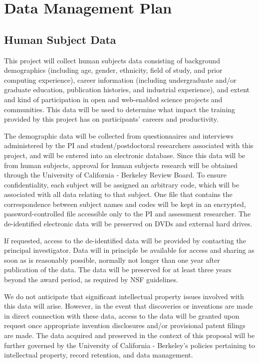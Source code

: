 \documentclass{proposalnsf}
\newlength{\up}
\begin{document}
\newpage
{}
\renewcommand{\thepage} {\footnotesize Data Management\,---\,\arabic{page}}

\section*{Data Management Plan}

\subsection*{Human Subject Data}

This project will collect human subjects data consisting of background
demographics (including age, gender, ethnicity, field of study, and
prior computing experience), career information (including
undergraduate and/or graduate education, publication histories, and
industrial experience), and extent and kind of participation in open
and web-enabled science projects and communities.  This data will be
used to determine what impact the training provided by this project
has on participants' careers and productivity.

The demographic data will be collected from questionnaires and
interviews administered by the PI and student/postdoctoral researchers
associated with this project, and will be entered into an electronic
database.  Since this data will be from human subjects, approval for
human subjects research will be obtained through the University of
California - Berkeley Review Board.  To ensure confidentiality, each
subject will be assigned an arbitrary code, which will be associated
with all data relating to that subject.  One file that contains the
correspondence between subject names and codes will be kept in an
encrypted, password-controlled file accessible only to the PI and
assessment researcher.  The de-identified electronic data will be
preserved on DVDs and external hard drives.

If requested, access to the de-identified data will be provided by
contacting the principal investigator. Data will in principle be
available for access and sharing as soon as is reasonably possible,
normally not longer than one year after publication of the data. The
data will be preserved for at least three years beyond the award
period, as required by NSF guidelines.

We do not anticipate that significant intellectual property issues
involved with this data will arise. However, in the event that
discoveries or inventions are made in direct connection with these
data, access to the data will be granted upon request once appropriate
invention disclosures and/or provisional patent filings are made.  The
data acquired and preserved in the context of this proposal will be
further governed by the University of California - Berkeley's policies
pertaining to intellectual property, record retention, and data
management.
\end{document}
